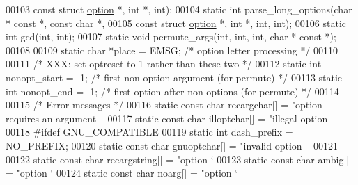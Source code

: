 \begin{DoxyCode}
00103                \textcolor{keyword}{const} \textcolor{keyword}{struct} \hyperlink{structoption}{option} *, \textcolor{keywordtype}{int} *, \textcolor{keywordtype}{int});
00104 \textcolor{keyword}{static} \textcolor{keywordtype}{int} parse\_long\_options(\textcolor{keywordtype}{char} * \textcolor{keyword}{const} *, \textcolor{keyword}{const} \textcolor{keywordtype}{char} *,
00105                   \textcolor{keyword}{const} \textcolor{keyword}{struct} \hyperlink{structoption}{option} *, \textcolor{keywordtype}{int} *, \textcolor{keywordtype}{int}, \textcolor{keywordtype}{int});
00106 \textcolor{keyword}{static} \textcolor{keywordtype}{int} gcd(\textcolor{keywordtype}{int}, \textcolor{keywordtype}{int});
00107 \textcolor{keyword}{static} \textcolor{keywordtype}{void} permute\_args(\textcolor{keywordtype}{int}, \textcolor{keywordtype}{int}, \textcolor{keywordtype}{int}, \textcolor{keywordtype}{char} * \textcolor{keyword}{const} *);
00108 
00109 \textcolor{keyword}{static} \textcolor{keywordtype}{char} *place = EMSG; \textcolor{comment}{/* option letter processing */}
00110 
00111 \textcolor{comment}{/* XXX: set optreset to 1 rather than these two */}
00112 \textcolor{keyword}{static} \textcolor{keywordtype}{int} nonopt\_start = -1; \textcolor{comment}{/* first non option argument (for permute) */}
00113 \textcolor{keyword}{static} \textcolor{keywordtype}{int} nonopt\_end = -1;   \textcolor{comment}{/* first option after non options (for permute) */}
00114 
00115 \textcolor{comment}{/* Error messages */}
00116 \textcolor{keyword}{static} \textcolor{keyword}{const} \textcolor{keywordtype}{char} recargchar[] = \textcolor{stringliteral}{"option requires an argument -- %
00117 \textcolor{keyword}{static} \textcolor{keyword}{const} \textcolor{keywordtype}{char} illoptchar[] = \textcolor{stringliteral}{"illegal option -- %
00118 \textcolor{preprocessor}{#ifdef GNU\_COMPATIBLE}
00119 \textcolor{keyword}{static} \textcolor{keywordtype}{int} dash\_prefix = NO\_PREFIX;
00120 \textcolor{keyword}{static} \textcolor{keyword}{const} \textcolor{keywordtype}{char} gnuoptchar[] = \textcolor{stringliteral}{"invalid option -- %
00121 
00122 \textcolor{keyword}{static} \textcolor{keyword}{const} \textcolor{keywordtype}{char} recargstring[] = \textcolor{stringliteral}{"option `%
00123 \textcolor{keyword}{static} \textcolor{keyword}{const} \textcolor{keywordtype}{char} ambig[] = \textcolor{stringliteral}{"option `%
00124 \textcolor{keyword}{static} \textcolor{keyword}{const} \textcolor{keywordtype}{char} noarg[] = \textcolor{stringliteral}{"option `%
}}}}}}
\end{DoxyCode}
